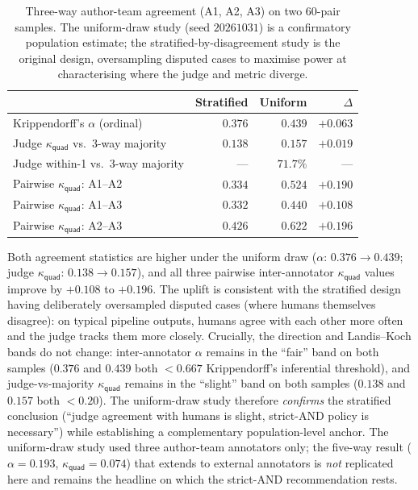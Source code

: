 \begin{table}[!htbp]
  \centering
  \caption{Three-way author-team agreement (A1, A2, A3) on two 60-pair
    samples. The uniform-draw study (seed $20261031$) is a confirmatory
    population estimate; the stratified-by-disagreement study is the
    original design, oversampling disputed cases to maximise power at
    characterising where the judge and metric diverge.}
  \label{tab:human_eval_uniform_vs_stratified}
  \begin{tabular}{lrrr}
    \toprule
     & Stratified & Uniform & $\Delta$ \\
    \midrule
    Krippendorff's $\alpha$ (ordinal)         & $0.376$ & $0.439$ & $+0.063$ \\
    Judge $\kappa_{\textsf{quad}}$ vs.\ 3-way majority & $0.138$ & $0.157$ & $+0.019$ \\
    Judge within-1 vs.\ 3-way majority        & ---     & $71.7\%$ & --- \\
    \midrule
    Pairwise $\kappa_{\textsf{quad}}$: A1--A2 & $0.334$ & $0.524$ & $+0.190$ \\
    Pairwise $\kappa_{\textsf{quad}}$: A1--A3 & $0.332$ & $0.440$ & $+0.108$ \\
    Pairwise $\kappa_{\textsf{quad}}$: A2--A3 & $0.426$ & $0.622$ & $+0.196$ \\
    \bottomrule
  \end{tabular}
\end{table}

Both agreement statistics are higher under the uniform draw ($\alpha$: $0.376 \to 0.439$; judge $\kappa_{\textsf{quad}}$: $0.138 \to 0.157$), and all three pairwise inter-annotator $\kappa_{\textsf{quad}}$ values improve by $+0.108$ to $+0.196$. The uplift is consistent with the stratified design having deliberately oversampled disputed cases (where humans themselves disagree): on typical pipeline outputs, humans agree with each other more often and the judge tracks them more closely. Crucially, the direction and Landis--Koch bands do not change: inter-annotator $\alpha$ remains in the ``fair'' band on both samples ($0.376$ and $0.439$ both $< 0.667$ Krippendorff's inferential threshold), and judge-vs-majority $\kappa_{\textsf{quad}}$ remains in the ``slight'' band on both samples ($0.138$ and $0.157$ both $< 0.20$). The uniform-draw study therefore \emph{confirms} the stratified conclusion (``judge agreement with humans is slight, strict-AND policy is necessary'') while establishing a complementary population-level anchor. The uniform-draw study used three author-team annotators only; the five-way result ($\alpha = 0.193$, $\kappa_{\textsf{quad}} = 0.074$) that extends to external annotators is \emph{not} replicated here and remains the headline on which the strict-AND recommendation rests.

